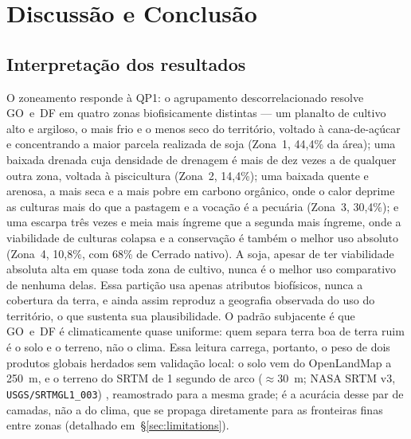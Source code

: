 \chapter{Discussão e Conclusão}\label{ch:discussion}

\section{Interpretação dos resultados}\label{sec:interpretation}

O zoneamento responde à QP1: o agrupamento descorrelacionado resolve GO~e~DF em quatro zonas
biofisicamente distintas --- um planalto de
cultivo alto e argiloso, o mais frio e o menos seco do território, voltado à cana-de-açúcar e
concentrando a maior parcela realizada de soja (Zona~1, 44,4\% da área); uma baixada drenada
cuja densidade de drenagem é mais de dez vezes a de qualquer outra zona, voltada à piscicultura
(Zona~2, 14,4\%); uma baixada quente e arenosa, a mais seca e a mais pobre em carbono orgânico,
onde o calor deprime as culturas mais do que a pastagem e a vocação é a pecuária (Zona~3,
30,4\%); e uma escarpa três vezes e meia mais íngreme que a segunda mais íngreme, onde a viabilidade de
culturas colapsa e a conservação é também o melhor uso absoluto (Zona~4, 10,8\%, com 68\% de
Cerrado nativo). A soja, apesar de ter viabilidade absoluta alta em quase toda zona de
cultivo, nunca é o melhor uso comparativo de nenhuma delas. Essa partição usa apenas
atributos biofísicos, nunca a cobertura da terra, e ainda assim reproduz a geografia
observada do uso do território, o que sustenta sua plausibilidade. O padrão subjacente é que
GO~e~DF é climaticamente quase uniforme: quem separa terra boa de terra ruim é o solo e o
terreno, não o clima. Essa leitura carrega, portanto, o peso de dois produtos globais herdados
sem validação local: o solo vem do OpenLandMap a 250~m, e o terreno do SRTM de 1 segundo de arco
($\approx$30~m; NASA SRTM v3, \texttt{USGS/SRTMGL1\_003}) \citep[p.~3]{farr_shuttle_2007},
reamostrado para a mesma grade; é a acurácia desse par de camadas, não a do
clima, que se propaga diretamente para as fronteiras finas entre zonas (detalhado
em~\S\ref{sec:limitations}).

